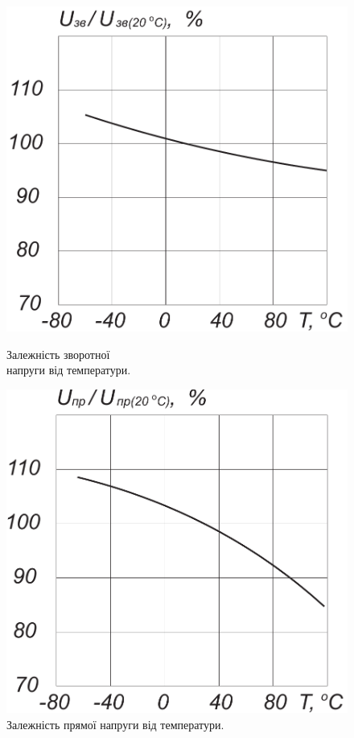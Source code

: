 \documentclass[a4paper,14pt]{extreport}
\begin{document}
\begin{figure}[h!]\label{im8}
  \begin{minipage}[h]{0.5\linewidth}
    \includegraphics[width=1\linewidth]{1.5.4.pdf}
    \caption{Залежність зворотної\\ напруги від температури.}
  \end{minipage}
\hfill
  \begin{minipage}[h]{0.5\linewidth}
    \includegraphics[width=1\linewidth]{1.5.5.pdf}
    \caption{Залежність прямої напруги від температури.}
  \end{minipage}
\end{figure}
\end{document}
